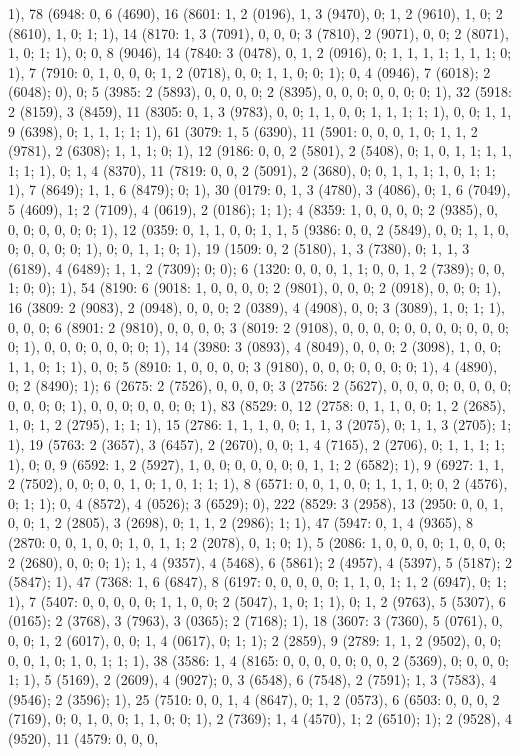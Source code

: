 {1), 78 (6948: 0, 6 (4690), 16 (8601: 1, 2 (0196), 1, 3 (9470), 0; 1, 2 (9610), 1, 0; 2 (8610), 1, 0; 1; 1), 14 (8170: 1, 3 (7091), 0, 0, 0; 3 (7810), 2 (9071), 0, 0; 2 (8071), 1, 0; 1; 1), 0; 0, 8 (9046), 14 (7840: 3 (0478), 0, 1, 2 (0916), 0; 1, 1, 1, 1; 1, 1, 1; 0; 1), 7 (7910: 0, 1, 0, 0, 0; 1, 2 (0718), 0, 0; 1, 1, 0; 0; 1); 0, 4 (0946), 7 (6018); 2 (6048); 0), 0; 5 (3985: 2 (5893), 0, 0, 0, 0; 2 (8395), 0, 0, 0; 0, 0, 0; 0; 1), 32 (5918: 2 (8159), 3 (8459), 11 (8305: 0, 1, 3 (9783), 0, 0; 1, 1, 0, 0; 1, 1, 1; 1; 1), 0, 0; 1, 1, 9 (6398), 0; 1, 1, 1; 1; 1), 61 (3079: 1, 5 (6390), 11 (5901: 0, 0, 0, 1, 0; 1, 1, 2 (9781), 2 (6308); 1, 1, 1; 0; 1), 12 (9186: 0, 0, 2 (5801), 2 (5408), 0; 1, 0, 1, 1; 1, 1, 1; 1; 1), 0; 1, 4 (8370), 11 (7819: 0, 0, 2 (5091), 2 (3680), 0; 0, 1, 1, 1; 1, 0, 1; 1; 1), 7 (8649); 1, 1, 6 (8479); 0; 1), 30 (0179: 0, 1, 3 (4780), 3 (4086), 0; 1, 6 (7049), 5 (4609), 1; 2 (7109), 4 (0619), 2 (0186); 1; 1); 4 (8359: 1, 0, 0, 0, 0; 2 (9385), 0, 0, 0; 0, 0, 0; 0; 1), 12 (0359: 0, 1, 1, 0, 0; 1, 1, 5 (9386: 0, 0, 2 (5849), 0, 0; 1, 1, 0, 0; 0, 0, 0; 0; 1), 0; 0, 1, 1; 0; 1), 19 (1509: 0, 2 (5180), 1, 3 (7380), 0; 1, 1, 3 (6189), 4 (6489); 1, 1, 2 (7309); 0; 0); 6 (1320: 0, 0, 0, 1, 1; 0, 0, 1, 2 (7389); 0, 0, 1; 0; 0); 1), 54 (8190: 6 (9018: 1, 0, 0, 0, 0; 2 (9801), 0, 0, 0; 2 (0918), 0, 0; 0; 1), 16 (3809: 2 (9083), 2 (0948), 0, 0, 0; 2 (0389), 4 (4908), 0, 0; 3 (3089), 1, 0; 1; 1), 0, 0, 0; 6 (8901: 2 (9810), 0, 0, 0, 0; 3 (8019: 2 (9108), 0, 0, 0, 0; 0, 0, 0, 0; 0, 0, 0; 0; 1), 0, 0, 0; 0, 0, 0; 0; 1), 14 (3980: 3 (0893), 4 (8049), 0, 0, 0; 2 (3098), 1, 0, 0; 1, 1, 0; 1; 1), 0, 0; 5 (8910: 1, 0, 0, 0, 0; 3 (9180), 0, 0, 0; 0, 0, 0; 0; 1), 4 (4890), 0; 2 (8490); 1); 6 (2675: 2 (7526), 0, 0, 0, 0; 3 (2756: 2 (5627), 0, 0, 0, 0; 0, 0, 0, 0; 0, 0, 0; 0; 1), 0, 0, 0; 0, 0, 0; 0; 1), 83 (8529: 0, 12 (2758: 0, 1, 1, 0, 0; 1, 2 (2685), 1, 0; 1, 2 (2795), 1; 1; 1), 15 (2786: 1, 1, 1, 0, 0; 1, 1, 3 (2075), 0; 1, 1, 3 (2705); 1; 1), 19 (5763: 2 (3657), 3 (6457), 2 (2670), 0, 0; 1, 4 (7165), 2 (2706), 0; 1, 1, 1; 1; 1), 0; 0, 9 (6592: 1, 2 (5927), 1, 0, 0; 0, 0, 0, 0; 0, 1, 1; 2 (6582); 1), 9 (6927: 1, 1, 2 (7502), 0, 0; 0, 0, 1, 0; 1, 0, 1; 1; 1), 8 (6571: 0, 0, 1, 0, 0; 1, 1, 1, 0; 0, 2 (4576), 0; 1; 1); 0, 4 (8572), 4 (0526); 3 (6529); 0), 222 (8529: 3 (2958), 13 (2950: 0, 0, 1, 0, 0; 1, 2 (2805), 3 (2698), 0; 1, 1, 2 (2986); 1; 1), 47 (5947: 0, 1, 4 (9365), 8 (2870: 0, 0, 1, 0, 0; 1, 0, 1, 1; 2 (2078), 0, 1; 0; 1), 5 (2086: 1, 0, 0, 0, 0; 1, 0, 0, 0; 2 (2680), 0, 0; 0; 1); 1, 4 (9357), 4 (5468), 6 (5861); 2 (4957), 4 (5397), 5 (5187); 2 (5847); 1), 47 (7368: 1, 6 (6847), 8 (6197: 0, 0, 0, 0, 0; 1, 1, 0, 1; 1, 2 (6947), 0; 1; 1), 7 (5407: 0, 0, 0, 0, 0; 1, 1, 0, 0; 2 (5047), 1, 0; 1; 1), 0; 1, 2 (9763), 5 (5307), 6 (0165); 2 (3768), 3 (7963), 3 (0365); 2 (7168); 1), 18 (3607: 3 (7360), 5 (0761), 0, 0, 0; 1, 2 (6017), 0, 0; 1, 4 (0617), 0; 1; 1); 2 (2859), 9 (2789: 1, 1, 2 (9502), 0, 0; 0, 0, 1, 0; 1, 0, 1; 1; 1), 38 (3586: 1, 4 (8165: 0, 0, 0, 0, 0; 0, 0, 2 (5369), 0; 0, 0, 0; 1; 1), 5 (5169), 2 (2609), 4 (9027); 0, 3 (6548), 6 (7548), 2 (7591); 1, 3 (7583), 4 (9546); 2 (3596); 1), 25 (7510: 0, 0, 1, 4 (8647), 0; 1, 2 (0573), 6 (6503: 0, 0, 0, 2 (7169), 0; 0, 1, 0, 0; 1, 1, 0; 0; 1), 2 (7369); 1, 4 (4570), 1; 2 (6510); 1); 2 (9528), 4 (9520), 11 (4579: 0, 0, 0, }
